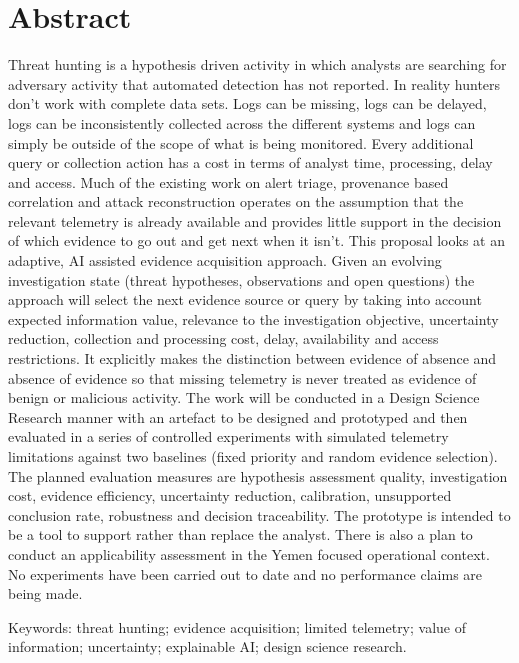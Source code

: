 \documentclass[a4paper,11pt]{article}
\begin{document}
\section*{Abstract}
Threat hunting is a hypothesis driven activity in which analysts are searching for adversary activity that automated detection has not reported. In reality hunters don't work with complete data sets. Logs can be missing, logs can be delayed, logs can be inconsistently collected across the different systems and logs can simply be outside of the scope of what is being monitored. Every additional query or collection action has a cost in terms of analyst time, processing, delay and access. Much of the existing work on alert triage, provenance based correlation and attack reconstruction operates on the assumption that the relevant telemetry is already available and provides little support in the decision of which evidence to go out and get next when it isn't. This proposal looks at an adaptive, AI assisted evidence acquisition approach. Given an evolving investigation state (threat hypotheses, observations and open questions) the approach will select the next evidence source or query by taking into account expected information value, relevance to the investigation objective, uncertainty reduction, collection and processing cost, delay, availability and access restrictions. It explicitly makes the distinction between evidence of absence and absence of evidence so that missing telemetry is never treated as evidence of benign or malicious activity. The work will be conducted in a Design Science Research manner with an artefact to be designed and prototyped and then evaluated in a series of controlled experiments with simulated telemetry limitations against two baselines (fixed priority and random evidence selection). The planned evaluation measures are hypothesis assessment quality, investigation cost, evidence efficiency, uncertainty reduction, calibration, unsupported conclusion rate, robustness and decision traceability. The prototype is intended to be a tool to support rather than replace the analyst. There is also a plan to conduct an applicability assessment in the Yemen focused operational context. No experiments have been carried out to date and no performance claims are being made.
\par
Keywords: threat hunting; evidence acquisition; limited telemetry; value of information; uncertainty; explainable AI; design science research.
\newpage
\end{document}
